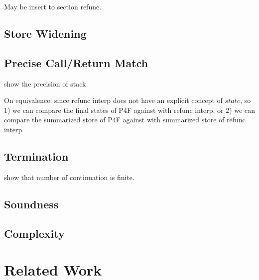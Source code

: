 \documentclass[acmsmall,review,anonymous]{acmart}\settopmatter{printfolios=true,printccs=false,printacmref=false}
\begin{document}
May be insert to section refunc.

\subsection{Store Widening}

\subsection{Precise Call/Return Match}

show the precision of stack

On equivalence: since refunc interp does not have an explicit concept of $state$,
so 1) we can compare the final states of P4F against with refunc interp,
or 2) we can compare the summarized store of P4F against with summarized store of refunc interp.

\subsection{Termination}

show that number of continuation is finite.

\subsection{Soundness}

\subsection{Complexity}


\section{Related Work}\label{sec:related}
\end{document}
